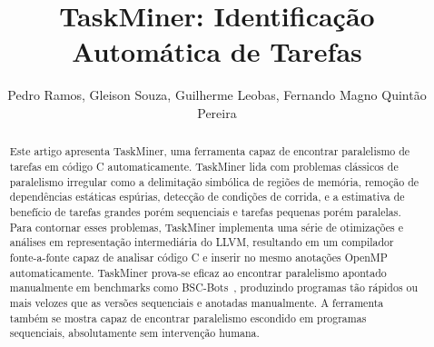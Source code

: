 \documentclass[sigplan,10pt,review]{acmart}
\newcommand\Taskminer{\mbox{\textsf{TaskMiner}}}
\begin{document}
\title[TaskMiner: Identifica\c{c}\~{a}o Autom\'{a}tica de Tarefas]
{TaskMiner: Identificação Automática de Tarefas}



\author{Pedro Ramos, Gleison Souza, Guilherme Leobas, Fernando Magno Quint\~{a}o Pereira}




\begin{abstract}
Este artigo apresenta \Taskminer{}, uma ferramenta capaz de encontrar paralelismo de tarefas
em código C automaticamente. \Taskminer{} lida com problemas clássicos de paralelismo irregular 
como a delimitação simbólica de regiões de memória, remoção de dependências
estáticas espúrias, detecção de condições de corrida, e a estimativa de benefício de tarefas grandes porém sequenciais e tarefas pequenas porém paralelas. Para contornar esses problemas,
\Taskminer{} implementa uma série de otimizações e análises em representa\-ção intermediária do LLVM, resultando
em um compilador fonte-a-fonte capaz de analisar código C e inserir no mesmo anotações OpenMP automaticamente. \Taskminer{} prova-se eficaz ao encontrar paralelismo apontado manualmente em benchmarks como \textsf{BSC-Bots}~\cite{Duran09}, produzindo programas tão rápidos ou mais velozes que as versões sequenciais e anotadas manualmente. A ferramenta também se mostra capaz de encontrar paralelismo escondido em programas sequenciais, absolutamente sem intervenção humana.
\end{abstract}
\end{document}
